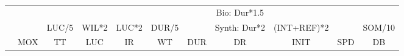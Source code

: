 \documentclass[a4paper,9pt]{article}
\begin{document}
\begin{tabular}{r|c|c|c|c|c|c|c|c|c|c}
   \multicolumn{1}{c}{}&
   \multicolumn{1}{c}{}&
   \multicolumn{1}{c}{}&
   \multicolumn{1}{c}{}&
   \multicolumn{1}{c}{}&
   \multicolumn{1}{c}{}&
   \multicolumn{1}{c}{}&
   \multicolumn{1}{c}{\tiny{Bio: Dur*1.5}}&
   \multicolumn{1}{c}{}&
   \multicolumn{1}{c}{}&
   \multicolumn{1}{c}{}\\
   \multicolumn{1}{c}{}&
   \multicolumn{1}{c}{}&
   \multicolumn{1}{c}{\tiny{LUC/5}}&
   \multicolumn{1}{c}{\tiny{WIL*2}}&
   \multicolumn{1}{c}{\tiny{LUC*2}}&
   \multicolumn{1}{c}{\tiny{DUR/5}}&
   \multicolumn{1}{c}{}&
   \multicolumn{1}{c}{\tiny{Synth: Dur*2}}&
   \multicolumn{1}{c}{\tiny{(INT+REF)*2}}&
   \multicolumn{1}{c}{}&
   \multicolumn{1}{c}{\tiny{SOM/10}}\\

   & MOX & TT & LUC & IR & WT & DUR & DR & INIT & SPD & DB\\ \hline
\end{tabular}





\end{document}
